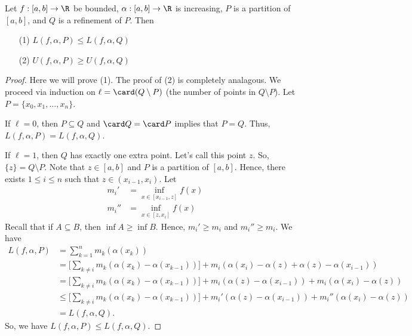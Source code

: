 \begin{theorem}[Rudin 6.4]
    Let \( f: [a,b] \to \R  \) be bounded, \( \alpha : [a,b] \to \R  \) is increasing, \( P  \) is a partition of \( [a,b] \), and \( Q  \) is a refinement of \( P  \). Then
    \begin{enumerate}
        \item[(1)] \( L(f,\alpha,P) \leq L(f,\alpha, Q) \)
        \item[(2)] \( U(f,\alpha, P) \geq U(f,\alpha, Q ) \)
    \end{enumerate}
\end{theorem}
\begin{proof}
Here we will prove (1). The proof of (2) is completely analagous. We proceed via induction on \( \ell = \card (Q \setminus  P )  \) (the number of points in \( Q \setminus  P  \)). Let \( P = \{  {x}_{0}, {x}_{1}, \dots, {x}_{n} \}  \). 

If \( \ell = 0  \), then \( P \subseteq  Q   \) and \( \card Q = \card P  \) implies that \( P = Q  \). Thus, \( L(f,\alpha, P) = L(f,\alpha, Q ) \).

If \( \ell = 1  \), then \( Q  \) has exactly one extra point. Let's call this point \( z  \). So, \( \{ z  \}  = Q \setminus  P  \). Note that \( z \in [a,b] \) and \( P  \) is a partition of \( [a,b] \). Hence, there exists \( 1 \leq i \leq n  \) such that \( z \in ({x}_{i-1}, {x}_{i}) \). Let 
\begin{align*}
    {m}_{i}' &= \inf_{x \in [{x}_{i-1}, z]} f(x)  \\
    {m}_{i}'' &= \inf_{x \in [z,{x}_{i}]} f(x)
\end{align*}
Recall that if \( A \subseteq  B  \), then \( \inf A \geq \inf B  \). Hence, \( {m}_{i}' \geq {m}_{i} \) and \( {m}_{i}'' \geq {m}_{i} \).
We have 
\begin{align*}
    L(f,\alpha, P ) &= \sum_{ k=1  }^{ n } {m}_{k } (\alpha({x}_{k})) \\ 
                    &= \Big[ \sum_{ k \neq i  }^{  } {m}_{k } (\alpha({x}_{k}) - \alpha({x}_{k-1})) \Big] + {m}_{i} (\alpha({x}_{i}) - \alpha(z) + \alpha(z) - \alpha({x}_{i-1})) \\
                    &= \Big[ \sum_{ k \neq i  }^{  } {m}_{k } (\alpha({x}_{k}) - \alpha({x}_{k-1}))  \Big] +  {m}_{i}(\alpha(z) - \alpha({x}_{i-1})) + {m}_{i} (\alpha({x}_{i}) - \alpha(z) ) \\
                    &\leq \Big[\sum_{ k \neq i  }^{  } {m}_{k } (\alpha({x}_{k}) - \alpha({x}_{k-1})) \Big] + {m}_{i}' (\alpha(z) - \alpha({x}_{i-1})) + {m}_{i}''(\alpha({x}_{i}) - \alpha(z)) \\
                    &= L(f,\alpha, Q ).
\end{align*} 
So, we have \( L(f,\alpha,P) \leq L(f,\alpha,Q ) \).


\end{proof}
